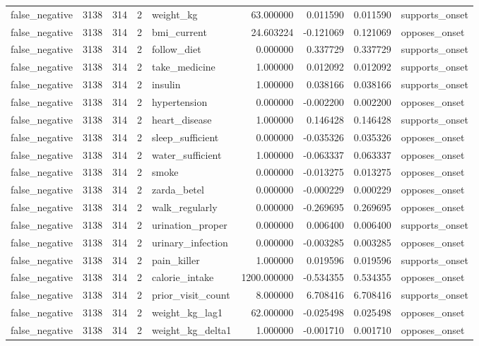 \begin{longtable}{lrrrlrrrl}
false\_negative & 3138 & 314 & 2 & weight\_kg & 63.000000 & 0.011590 & 0.011590 & supports\_onset \\
false\_negative & 3138 & 314 & 2 & bmi\_current & 24.603224 & -0.121069 & 0.121069 & opposes\_onset \\
false\_negative & 3138 & 314 & 2 & follow\_diet & 0.000000 & 0.337729 & 0.337729 & supports\_onset \\
false\_negative & 3138 & 314 & 2 & take\_medicine & 1.000000 & 0.012092 & 0.012092 & supports\_onset \\
false\_negative & 3138 & 314 & 2 & insulin & 1.000000 & 0.038166 & 0.038166 & supports\_onset \\
false\_negative & 3138 & 314 & 2 & hypertension & 0.000000 & -0.002200 & 0.002200 & opposes\_onset \\
false\_negative & 3138 & 314 & 2 & heart\_disease & 1.000000 & 0.146428 & 0.146428 & supports\_onset \\
false\_negative & 3138 & 314 & 2 & sleep\_sufficient & 0.000000 & -0.035326 & 0.035326 & opposes\_onset \\
false\_negative & 3138 & 314 & 2 & water\_sufficient & 1.000000 & -0.063337 & 0.063337 & opposes\_onset \\
false\_negative & 3138 & 314 & 2 & smoke & 0.000000 & -0.013275 & 0.013275 & opposes\_onset \\
false\_negative & 3138 & 314 & 2 & zarda\_betel & 0.000000 & -0.000229 & 0.000229 & opposes\_onset \\
false\_negative & 3138 & 314 & 2 & walk\_regularly & 0.000000 & -0.269695 & 0.269695 & opposes\_onset \\
false\_negative & 3138 & 314 & 2 & urination\_proper & 0.000000 & 0.006400 & 0.006400 & supports\_onset \\
false\_negative & 3138 & 314 & 2 & urinary\_infection & 0.000000 & -0.003285 & 0.003285 & opposes\_onset \\
false\_negative & 3138 & 314 & 2 & pain\_killer & 1.000000 & 0.019596 & 0.019596 & supports\_onset \\
false\_negative & 3138 & 314 & 2 & calorie\_intake & 1200.000000 & -0.534355 & 0.534355 & opposes\_onset \\
false\_negative & 3138 & 314 & 2 & prior\_visit\_count & 8.000000 & 6.708416 & 6.708416 & supports\_onset \\
false\_negative & 3138 & 314 & 2 & weight\_kg\_lag1 & 62.000000 & -0.025498 & 0.025498 & opposes\_onset \\
false\_negative & 3138 & 314 & 2 & weight\_kg\_delta1 & 1.000000 & -0.001710 & 0.001710 & opposes\_onset \\

\end{longtable}
